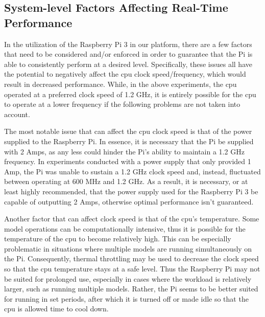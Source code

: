 \subsection{System-level Factors Affecting Real-Time Performance}
In the utilization of the Raspberry Pi 3 in our platform, there are a
few factors that need to be considered and/or enforced in order to
guarantee that the Pi is able to consistently perform at a desired
level. Specifically, these issues all have the potential to negatively
affect the cpu clock speed/frequency, which would result in decreased
performance. While, in the above experiments, the cpu operated at a
preferred clock speed of 1.2 GHz, it is entirely possible for the cpu
to operate at a lower frequency if the following problems are not
taken into account. 

The most notable issue that can affect the cpu clock speed is that of
the power supplied to the Raspberry Pi. In essence, it is necessary
that the Pi be supplied with 2 Amps, as any less could hinder the Pi's
ability to maintain a 1.2 GHz frequency. In experiments conducted with
a power supply that only provided 1 Amp, the Pi was unable to sustain
a 1.2 GHz clock speed and, instead, fluctuated between operating at
600 MHz and 1.2 GHz. As a result, it is necessary, or at least highly
recommended, that the power supply used for the Raspberry Pi 3 be
capable of outputting 2 Amps, otherwise optimal performance isn't
guaranteed.

Another factor that can affect clock speed is that of the
cpu's temperature. Some model operations can be computationally
intensive, thus it is possible for the temperature of the cpu to
become relatively high. This can be especially problematic in
situations where multiple models are running  simultaneously on the
Pi. Consequently, thermal throttling may be used to decrease the clock
speed so that the cpu temperature stays at a safe level. Thus the
Raspberry Pi may not be suited for prolonged use, especially in cases
where the workload is relatively larger, such as running multiple
models. Rather, the Pi seems to be better suited for running in set
periods, after which it is turned  off or made idle so that the cpu is
allowed time to cool down. 

